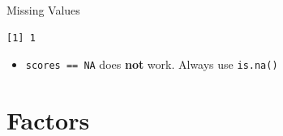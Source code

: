 \documentclass[
  ignorenonframetext,
  aspectratio=169,
]{beamer}
\providecommand{\tightlist}{%
  \setlength{\itemsep}{0pt}\setlength{\parskip}{0pt}}\usepackage{longtable,booktabs,array}
\begin{document}
\begin{frame}[fragile]{Missing Values}
\begingroup\tiny\color{darkgray}

\begin{verbatim}
[1] 1
\end{verbatim}

\endgroup

\begin{itemize}
\tightlist
\item
  \texttt{scores\ ==\ NA} does \textbf{not} work. Always use
  \texttt{is.na()}
\end{itemize}
\end{frame}

\hypertarget{sec-factors}{%
\section{Factors}\label{sec-factors}}
\end{document}
